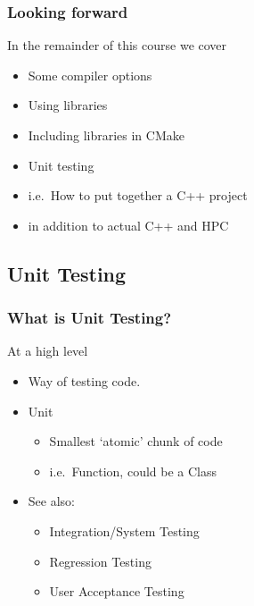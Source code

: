 \subsubsection{Looking forward}\label{looking-forward}

In the remainder of this course we cover

\begin{itemize}
\itemsep1pt\parskip0pt
\item
  Some compiler options
\item
  Using libraries
\item
  Including libraries in CMake
\item
  Unit testing
\item
  i.e.~How to put together a C++ project
\item
  in addition to actual C++ and HPC
\end{itemize}

\subsection{Unit Testing}\label{unit-testing}

\subsubsection{What is Unit Testing?}\label{what-is-unit-testing}

At a high level

\begin{itemize}
\itemsep1pt\parskip0pt
\item
  Way of testing code.
\item
  Unit

  \begin{itemize}
  \itemsep1pt\parskip0pt
  \item
    Smallest `atomic' chunk of code
  \item
    i.e.~Function, could be a Class
  \end{itemize}
\item
  See also:

  \begin{itemize}
  \itemsep1pt\parskip0pt
  \item
    Integration/System Testing
  \item
    Regression Testing
  \item
    User Acceptance Testing
  \end{itemize}
\end{itemize}

